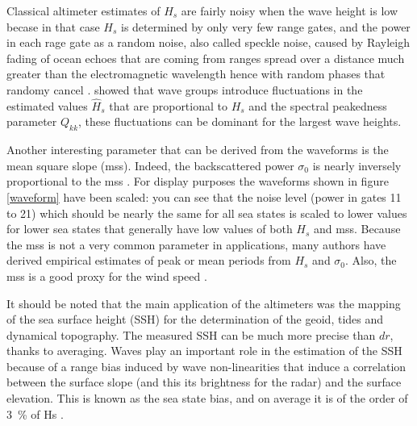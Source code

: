 Classical altimeter estimates of $H_s$ are fairly noisy when the wave height is low becase in that case $H_s$ is determined by only very few range gates, and the power in each rage gate as a random noise, also called speckle noise, caused by Rayleigh fading of ocean echoes that are coming from ranges spread over a distance much greater than the electromagnetic wavelength hence with random phases that randomy cancel \citep{Quartly&al.2001}. 
\cite{DeCarlo&al.2023} showed that wave groups introduce fluctuations in the estimated values $\widehat{H}_s$ that are proportional to $H_s$ and the spectral peakedness parameter $Q_{kk}$, these fluctuations can be dominant for the largest wave heights. 



Another interesting parameter that can be derived from the waveforms is the mean square slope (mss). Indeed, 
the backscattered power $\sigma_0$ is nearly inversely proportional to the mss \citep{Vandemark&al.2002}. 
For display purposes the waveforms shown in figure \ref{waveform} have been scaled: you can see that the noise level (power in gates 11 to 21) which should be nearly the same for 
all sea states is scaled to lower values for lower sea states that generally have low values of both $H_s$ and mss.  
Because the mss is not a very common parameter in applications, many authors have derived empirical estimates of peak or mean  periods from $H_s$ and $\sigma_0$. Also, the mss is a good proxy for the wind speed \citep{Cox&Munk1954}.



It should be noted that the main application of the altimeters was the mapping of the sea surface height (SSH) for the determination of the geoid, tides and dynamical topography. The measured
 SSH can be much more precise than $dr$, thanks to averaging. Waves play an important role in the estimation of the SSH because of a range bias induced by wave non-linearities that induce a correlation between the surface slope (and this its brightness for the radar) and the surface elevation. This is known as 
 the sea state bias, and on average it is of the order of
 3~\% of Hs \citep[e.g.][]{Minster&al.1992}. 
 
